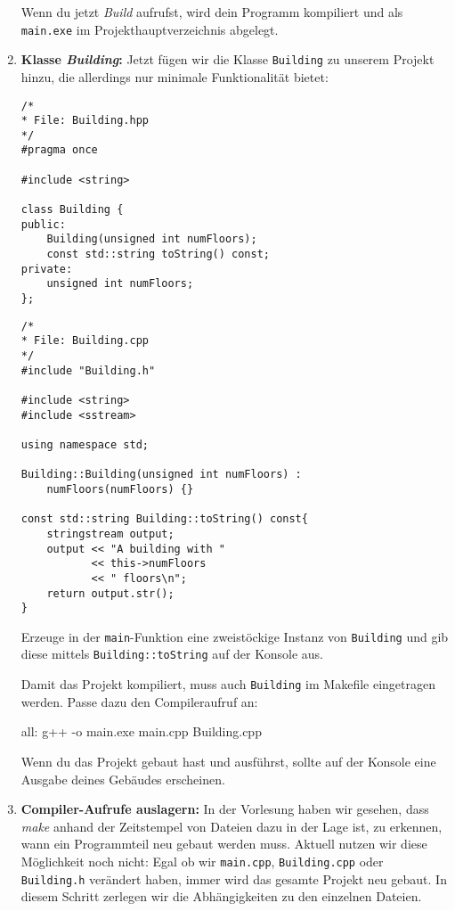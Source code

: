 \begin{enumerate}
Wenn du jetzt \emph{Build} aufrufst, wird dein Programm kompiliert und als \texttt{main.exe} im Projekthauptverzeichnis abgelegt.

\item\textbf{Klasse \emph{Building}:}
Jetzt fügen wir die Klasse \texttt{Building} zu unserem Projekt hinzu, die allerdings nur minimale Funktionalität bietet:

\begin{minipage}[t]{.45\textwidth}
\begin{lstlisting}
/*
* File: Building.hpp
*/
#pragma once

#include <string>

class Building {
public:
    Building(unsigned int numFloors);
    const std::string toString() const;
private:
    unsigned int numFloors;
};
\end{lstlisting}
\end{minipage}
\begin{minipage}[t]{.45\textwidth}
\begin{lstlisting}
/*
* File: Building.cpp
*/
#include "Building.h"

#include <string>
#include <sstream>

using namespace std;

Building::Building(unsigned int numFloors) :
    numFloors(numFloors) {}

const std::string Building::toString() const{
    stringstream output;
    output << "A building with "
           << this->numFloors
           << " floors\n";
    return output.str();
}
\end{lstlisting}
\end{minipage}

Erzeuge in der \texttt{main}-Funktion eine zweistöckige Instanz von \texttt{Building} und gib diese mittels \texttt{Building::toString} auf der Konsole aus.

Damit das Projekt kompiliert, muss auch \texttt{Building} im Makefile eingetragen werden.
Passe dazu den Compileraufruf an:
\begin{lstmake}
all:
    g++ -o main.exe main.cpp Building.cpp
\end{lstmake}

Wenn du das Projekt gebaut hast und ausführst, sollte auf der Konsole eine Ausgabe deines Gebäudes erscheinen.

\item\textbf{Compiler-Aufrufe auslagern:}
In der Vorlesung haben wir gesehen, dass \emph{make} anhand der Zeitstempel von Dateien dazu in der Lage ist, zu erkennen, wann ein Programmteil neu gebaut werden muss.
Aktuell nutzen wir diese Möglichkeit noch nicht:
Egal ob wir \texttt{main.cpp}, \texttt{Building.cpp} oder \texttt{Building.h} verändert haben, immer wird das gesamte Projekt neu gebaut.
In diesem Schritt zerlegen wir die Abhängigkeiten zu den einzelnen Dateien.


\end{enumerate}
